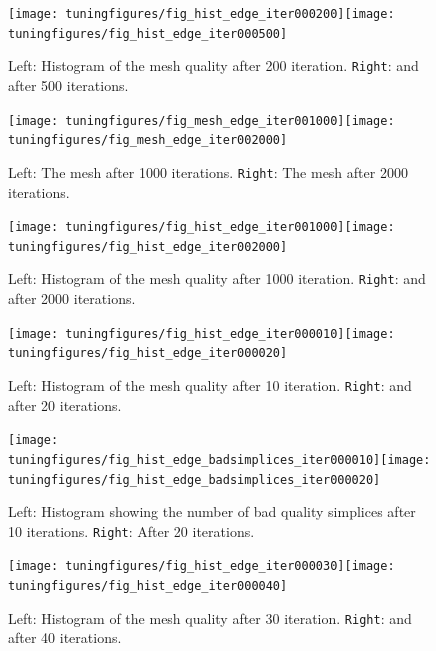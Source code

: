 \documentclass[10pt,a4paper]{book}
\begin{document}
\begin{figure}[tbhp]
\centerline{\texttt{[image: tuningfigures/fig\_hist\_edge\_iter000200]}\hspace{3cm}\texttt{[image: tuningfigures/fig\_hist\_edge\_iter000500]}}
\caption{\label{fig:histogram3} Left: Histogram of the mesh quality after 200 iteration. \texttt{Right}: and after 500 iterations.}
\end{figure}

\begin{figure}[tbhp]
\centerline{\texttt{[image: tuningfigures/fig\_mesh\_edge\_iter001000]}\hspace{3cm}\texttt{[image: tuningfigures/fig\_mesh\_edge\_iter002000]}}
\caption{\label{fig:iterations4} Left: The mesh after 1000 iterations. \texttt{Right}: The mesh after 2000 iterations.}
\end{figure}

\begin{figure}[tbhp]
\centerline{\texttt{[image: tuningfigures/fig\_hist\_edge\_iter001000]}\hspace{3cm}\texttt{[image: tuningfigures/fig\_hist\_edge\_iter002000]}}
\caption{\label{fig:histogram4} Left: Histogram of the mesh quality after 1000 iteration. \texttt{Right}: and after 2000 iterations.}
\end{figure}


\begin{figure}[tbhp]
\centerline{\texttt{[image: tuningfigures/fig\_hist\_edge\_iter000010]}\hspace{3cm}\texttt{[image: tuningfigures/fig\_hist\_edge\_iter000020]}}
\caption{\label{fig:histogram20} Left: Histogram of the mesh quality
  after 10 iteration. \texttt{Right}: and after 20 iterations.}
\end{figure}

\begin{figure}[tbhp]
\centerline{\texttt{[image: tuningfigures/fig\_hist\_edge\_badsimplices\_iter000010]}\hspace{3cm}\texttt{[image: tuningfigures/fig\_hist\_edge\_badsimplices\_iter000020]}}
\caption{\label{fig:fig_hist_edge_badsimplices_iter000020} Left: Histogram showing the number of
  bad quality simplices after 10 iterations. \texttt{Right}: After 20 iterations.}
\end{figure}

\begin{figure}[tbhp]
\centerline{\texttt{[image: tuningfigures/fig\_hist\_edge\_iter000030]}\hspace{3cm}\texttt{[image: tuningfigures/fig\_hist\_edge\_iter000040]}}
\caption{\label{fig:histogram40} Left: Histogram of the mesh quality
  after 30 iteration. \texttt{Right}: and after 40 iterations.}
\end{figure}
\end{document}
